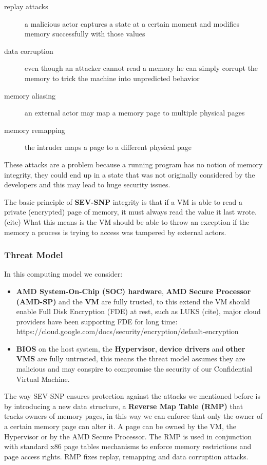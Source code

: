 \documentclass[twocolumn]{article}
\begin{document}
    \begin{description}
        \item[replay attacks] a malicious actor captures a state at a certain moment and modifies memory successfully with those values
        \item[data corruption] even though an attacker cannot read a memory he can simply corrupt the memory to trick the machine into unpredicted behavior
        \item[memory aliasing] an external actor may map a memory page to multiple physical pages
        \item[memory remapping] the intruder maps a page to a different physical page
    \end{description}

    These attacks are a problem because a running program has no notion of memory integrity, they could end up in a state that was not originally considered by the developers and this may lead to huge security issues.

    The basic principle of \textbf{SEV-SNP} integrity is that if a VM is able to read a private (encrypted) page of memory, it must always read the value it last wrote. (cite) What this means is the VM should be able to throw an exception if the memory a process is trying to access was tampered by external actors.

    \subsubsection*{Threat Model}
        In this computing model we consider:
        \begin{itemize}
            \item \textbf{AMD System-On-Chip (SOC) hardware}, \textbf{AMD Secure Processor (AMD-SP)} and the \textbf{VM} are fully trusted, to this extend the VM should enable Full Disk Encryption (FDE) at rest, such as LUKS (cite), major cloud providers have been supporting FDE for long time:  https://cloud.google.com/docs/security/encryption/default-encryption
            \item \textbf{BIOS} on the host system, the \textbf{Hypervisor}, \textbf{device drivers} and \textbf{other VMS} are fully untrusted, this means the threat model assumes they are malicious and may conspire to compromise the security of our Confidential Virtual Machine.
        \end{itemize}

    The way SEV-SNP ensures protection against the attacks we mentioned before is by introducing a new data structure, a \textbf{Reverse Map Table (RMP)} that tracks owners of memory pages, in this way we can enforce that only the owner of a certain memory page can alter it. A page can be owned by the VM, the Hypervisor or by the AMD Secure Processor. The RMP is used in conjunction with standard x86 page tables mechanisms to enforce memory restrictions and page access rights. RMP fixes replay, remapping and data corruption attacks. 
\end{document}
